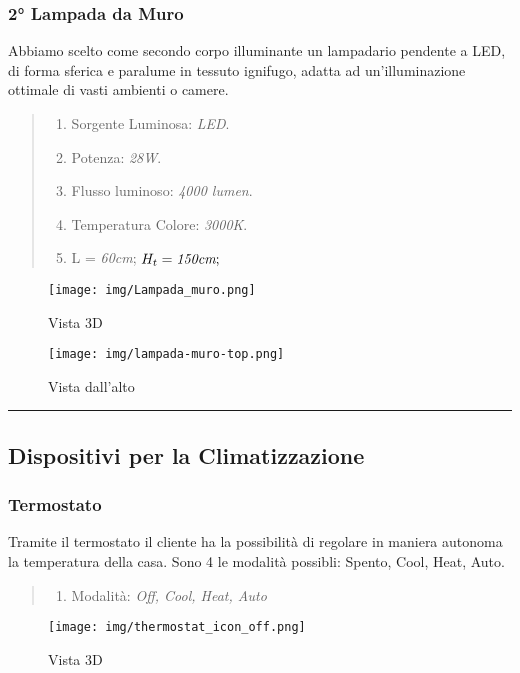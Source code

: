 \documentclass[italian, 12pt, a4paper]{article}
\begin{document}
\subsubsection{2° Lampada da Muro}
Abbiamo scelto come secondo corpo illuminante un lampadario pendente a LED, di forma sferica e paralume in tessuto ignifugo, adatta ad un'illuminazione ottimale di vasti ambienti o camere.
\begin{quote}
    \begin{enumerate}
        \item Sorgente Luminosa: \emph{LED}.
        \item Potenza: \emph{28W}.
        \item Flusso luminoso: \emph{4000 lumen}.
        \item Temperatura Colore: \emph{3000K}.
        \item L = \emph{60cm}; $H_t = \emph{150cm};$
    \end{enumerate}
    \vspace{-40pt}
\end{quote}
\begin{figure}[h!]
    \centering
    \begin{minipage}{0.45\textwidth}
        \centering
        \texttt{[image: img/Lampada\_muro.png]}
        \caption{Vista 3D}
    \end{minipage} \hfill
    \begin{minipage}{0.45\textwidth}
        \centering
        \texttt{[image: img/lampada-muro-top.png]}
        \caption{Vista dall'alto}
    \end{minipage}
\end{figure}
\hrule
\clearpage
\subsection{Dispositivi per la Climatizzazione}
\subsubsection{Termostato}
Tramite il termostato il cliente ha la possibilità di regolare in maniera autonoma la temperatura della casa. Sono 4 le modalità possibli: Spento, Cool, Heat, Auto.
\begin{quote}
    \begin{enumerate}
        \item Modalità: \emph{Off, Cool, Heat, Auto}
    \end{enumerate}
\end{quote}
\begin{figure}[h!]
    \centering
    \begin{minipage}{0.45\textwidth}
        \centering
        \texttt{[image: img/thermostat\_icon\_off.png]}
        \caption{Vista 3D}
    \end{minipage} \hfill
    
\end{figure}
\end{document}
